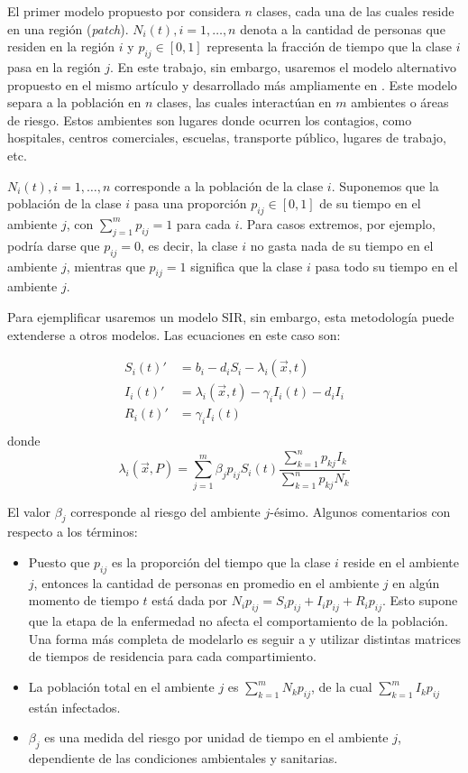 El primer modelo propuesto por \cite{Bichara2015} considera \(n\) clases, cada una de las cuales reside en una región (\textit{patch}). \(N_i(t), i = 1, \dots, n\) denota a la cantidad de personas que residen en la región \(i\) y \(p_{ij} \in [0,1]\) representa la fracción de tiempo que la clase \(i\) pasa en la región \(j\). En este trabajo, sin embargo, usaremos el modelo alternativo propuesto en el mismo artículo y desarrollado más ampliamente en \cite{Bichara2018}. Este modelo separa a la población en \(n\) clases, las cuales interactúan en \(m\) ambientes o áreas de riesgo. Estos ambientes son lugares donde ocurren los contagios, como hospitales, centros comerciales, escuelas, transporte público, lugares de trabajo, etc.

\(N_i(t), i = 1, \dots, n\) corresponde a la población de la clase \(i\). Suponemos que la población de la clase \(i\) pasa una proporción \(p_{ij} \in [0,1]\) de su tiempo en el ambiente \(j\), con \(\sum_{j = 1}^{m} p_{ij} = 1\) para cada \(i\). Para casos extremos, por ejemplo, podría darse que \(p_{ij} = 0\), es decir, la clase \(i\) no gasta nada de su tiempo en el ambiente \(j\), mientras que \(p_{ij} = 1\) significa que la clase \(i\) pasa todo su tiempo en el ambiente \(j\). 

Para ejemplificar usaremos un modelo SIR, sin embargo, esta metodología puede extenderse a otros modelos. Las ecuaciones en este caso son:

\[
\begin{aligned}
S_i(t)' &=  b_i - d_i S_i - {\lambda_i(\vec{x}, t) } \\
I_i(t)' &= {\lambda_i(\vec{x}, t) } - \gamma_i I_i(t) - d_i I_i\\
R_i(t)' &= \gamma_i I_i(t)\\ 
\end{aligned}
\]
donde 
\[\lambda_i(\vec{x}, P) = \sum_{j=1}^m \beta_{j}p_{ij}S_i(t)\frac{\sum_{k=1}^{n} p_{kj} I_k}{\sum_{k=1}^{n} p_{kj}N_k}\]

El valor \(\beta_j\) corresponde al riesgo del ambiente \(j\)-ésimo. Algunos comentarios con respecto a los términos: 

\begin{itemize}
\item Puesto que \(p_{ij}\) es la proporción del tiempo que la clase \(i\) reside en el ambiente \(j\), entonces la cantidad de personas en promedio en el ambiente \(j\) en algún momento de tiempo \(t\) está dada por \(N_i p_{ij} = S_i p_{ij} + I_i p_{ij} + R_i p_{ij}\). Esto supone que la etapa de la enfermedad no afecta el comportamiento de la población. Una forma más completa de modelarlo es seguir a \cite{Bichara2018} y utilizar distintas matrices de tiempos de residencia para cada compartimiento.
\item La población total en el ambiente \(j\) es \(\sum_{k = 1}^m N_k p_{ij}\), de la cual \(\sum_{k = 1}^m I_k p_{ij}\) están infectados.
\item \(\beta_j\) es una medida del riesgo por unidad de tiempo en el ambiente \(j\), dependiente de las condiciones ambientales y sanitarias.
\end{itemize}

